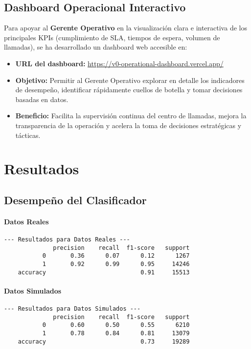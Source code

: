 \documentclass[12pt]{article}
\begin{document}
\subsection{Dashboard Operacional Interactivo}
Para apoyar al \textbf{Gerente Operativo} en la visualización clara e interactiva de los principales KPIs (cumplimiento de SLA, tiempos de espera, volumen de llamadas), se ha desarrollado un dashboard web accesible en:

\begin{itemize}
  \item \textbf{URL del dashboard:} 
    \href{https://v0-operational-dashboard.vercel.app/}{https://v0-operational-dashboard.vercel.app/}
  \item \textbf{Objetivo:}  
    Permitir al Gerente Operativo explorar en detalle los indicadores de desempeño, identificar rápidamente cuellos de botella y tomar decisiones basadas en datos.
  
  \item \textbf{Beneficio:}  
    Facilita la supervisión continua del centro de llamadas, mejora la transparencia de la operación y acelera la toma de decisiones estratégicas y tácticas.
\end{itemize}

\newpage
\section{Resultados}

\subsection{Desempeño del Clasificador}
\paragraph{Datos Reales}
\begin{verbatim}
--- Resultados para Datos Reales ---
              precision    recall  f1-score   support
           0       0.36      0.07      0.12      1267
           1       0.92      0.99      0.95     14246
    accuracy                           0.91     15513
\end{verbatim}

\paragraph{Datos Simulados}
\begin{verbatim}
--- Resultados para Datos Simulados ---
              precision    recall  f1-score   support
           0       0.60      0.50      0.55      6210
           1       0.78      0.84      0.81     13079
    accuracy                           0.73     19289
\end{verbatim}
\end{document}
